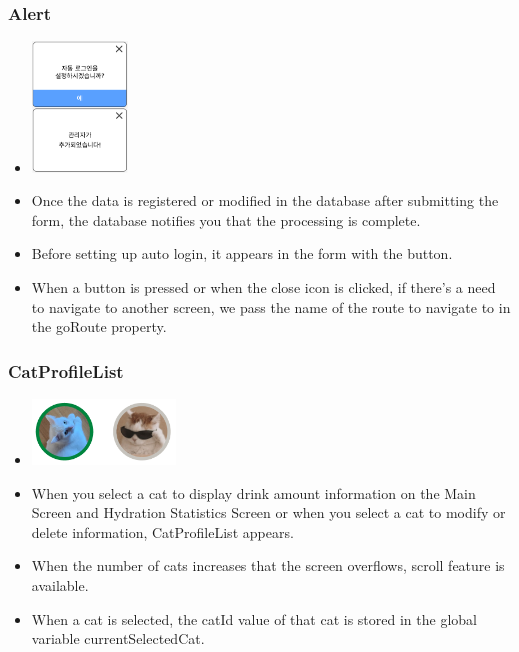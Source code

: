 \documentclass[conference]{IEEEtran}
\begin{document}
\subsubsection{Alert}
\begin{itemize}
    \item[] \includegraphics[width=0.2\textwidth]{img/Component/4.png}
    \item Once the data is registered or modified in the database after submitting the form, the database notifies you that the processing is complete.
    \item Before setting up auto login, it appears in the form with the button.
    \item When a button is pressed or when the close icon is clicked, if there's a need to navigate to another screen, we pass the name of the route to navigate to in the goRoute property. \\
\end{itemize}

\subsubsection{CatProfileList}
\begin{itemize}
    \item[] \includegraphics[width=0.3\textwidth]{img/Component/5.png}
    \item When you select a cat to display drink amount information on the Main Screen and Hydration Statistics Screen or when you select a cat to modify or delete information, CatProfileList appears.
    \item When the number of cats increases that the screen overflows, scroll feature is available.
    \item When a cat is selected, the catId value of that cat is stored in the global variable currentSelectedCat. \\
\end{itemize}
\end{document}
